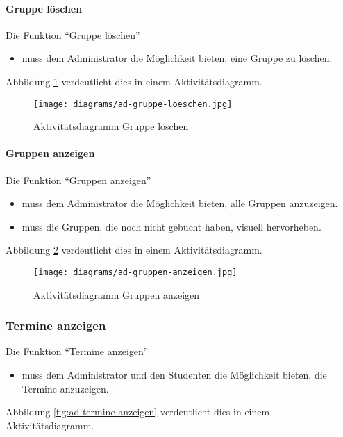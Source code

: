 \paragraph{Gruppe löschen}

Die Funktion ``Gruppe löschen''
\begin{itemize}
  \item muss dem Administrator die Möglichkeit bieten, eine Gruppe zu löschen.
\end{itemize}

Abbildung \ref{fig:ad-gruppe-loeschen} verdeutlicht dies in einem Aktivitätsdiagramm.

\begin{figure}
  \centering
  \texttt{[image: diagrams/ad-gruppe-loeschen.jpg]}
  \caption{Aktivitätsdiagramm Gruppe löschen}
  \label{fig:ad-gruppe-loeschen}
\end{figure}

\paragraph{Gruppen anzeigen}

Die Funktion ``Gruppen anzeigen''
\begin{itemize}
  \item muss dem Administrator die Möglichkeit bieten, alle Gruppen anzuzeigen.
  \item muss die Gruppen, die noch nicht gebucht haben, visuell hervorheben.
\end{itemize}

Abbildung \ref{fig:ad-gruppen-anzeigen} verdeutlicht dies in einem Aktivitätsdiagramm.

\begin{figure}
  \centering
  \texttt{[image: diagrams/ad-gruppen-anzeigen.jpg]}
  \caption{Aktivitätsdiagramm Gruppen anzeigen}
  \label{fig:ad-gruppen-anzeigen}
\end{figure}

\subsubsection{Termine anzeigen}

Die Funktion ``Termine anzeigen''
\begin{itemize}
  \item muss dem Administrator und den Studenten die Möglichkeit bieten, die Termine anzuzeigen.
\end{itemize}

Abbildung \ref{fig:ad-termine-anzeigen} verdeutlicht dies in einem Aktivitätsdiagramm.

